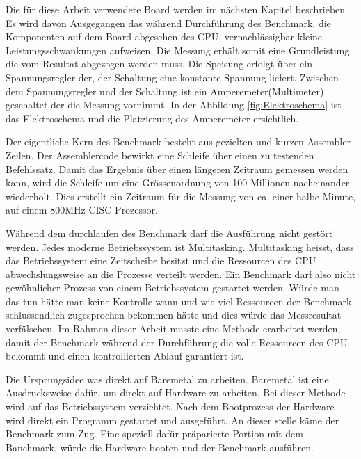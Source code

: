Die für diese Arbeit verwendete Board werden im nächsten Kapitel beschrieben. Es wird davon Ausgegangen das während Durchführung des Benchmark, die Komponenten auf dem Board abgesehen des CPU, vernachlässigbar kleine Leistungsschwankungen aufweisen. Die Messung erhält somit eine Grundleistung die vom Resultat abgezogen werden muss. Die Speisung erfolgt über ein Spannungsregler der, der Schaltung eine konstante Spannung liefert. Zwischen dem Spannungsregler und der Schaltung ist ein Amperemeter(Multimeter) geschaltet der die Messung vornimmt. In der Abbildung \ref{fig:Elektroschema} ist das Elektroschema und die Platzierung des Amperemeter ersichtlich.
\par
Der eigentliche Kern des Benchmark besteht aus gezielten und kurzen Assembler-Zeilen. Der Assemblercode bewirkt eine Schleife über einen zu testenden Befehlssatz. Damit das Ergebnis über einen längeren Zeitraum gemessen werden kann, wird die Schleife um eine Grössenordnung von 100 Millionen nacheinander wiederholt. Dies erstellt ein Zeitraum für die Messung von ca. einer halbe Minute, auf einem 800MHz CISC-Prozessor.
\par
Während dem durchlaufen des Benchmark darf die Ausführung nicht gestört werden. Jedes moderne Betriebssystem ist Multitasking. Multitasking heisst, dass das Betriebssystem eine Zeitscheibe besitzt und die Ressourcen des CPU abwechslungsweise an die Prozesse verteilt werden. Ein Benchmark darf also nicht gewöhnlicher Prozess von einem Betriebssystem gestartet werden. Würde man das tun hätte man keine Kontrolle wann und wie viel Ressourcen der Benchmark schlussendlich zugesprochen bekommen hätte und dies würde das Messresultat verfälschen. Im Rahmen dieser Arbeit musste eine Methode erarbeitet werden, damit der Benchmark während der Durchführung die volle Ressourcen des CPU bekommt und einen kontrollierten Ablauf garantiert ist.
\par
Die Ursprungsidee was direkt auf Baremetal zu arbeiten. Baremetal ist eine Ausdrucksweise dafür, um direkt auf Hardware zu arbeiten. Bei dieser Methode wird auf das Betriebssystem verzichtet. Nach dem Bootprozess der Hardware wird direkt ein Programm gestartet und ausgeführt. An dieser stelle käme der Benchmark zum Zug. Eine speziell dafür präparierte Portion mit dem Banchmark, würde die Hardware booten und der Benchmark ausführen.
\par

